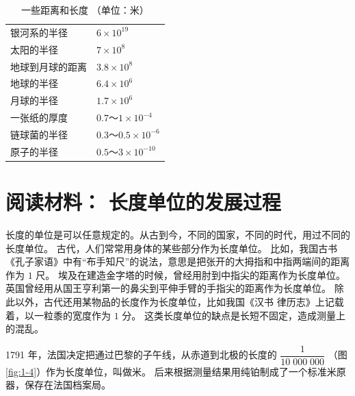 \begin{table}[H]
    \centering
    \caption*{一些距离和长度 （单位：米）}
    \begin{tabular}{w{l}{10em}w{r}{8em}}
        银河系的半径        & $6 \times 10^{19}$ \\
        太阳的半径          & $7 \times 10^8$ \\
        地球到月球的距离    & $3.8 \times 10^8$ \\
        地球的半径          & $6.4 \times 10^6$ \\
        月球的半径          & $1.7 \times 10^6$ \\
        一张纸的厚度        & $0.7 \text{～} 1 \times 10^{-4}$\footnotemark \\
        链球菌的半径        & $0.3 \text{～} 0.5 \times 10^{-6}$ \\
        原子的半径          & $0.5 \text{～} 3 \times 10^{-10}$ \\
    \end{tabular}
\end{table}


\section*{\textbf{阅读材料： 长度单位的发展过程}}

长度的单位是可以任意规定的。从古到今，不同的国家，不同的时代，用过不同的长度单位。
古代，人们常常用身体的某些部分作为长度单位。
比如，我国古书《孔子家语》中有“布手知尺”的说法，意思是把张开的大拇指和中指两端间的距离作为 $1$ 尺。
埃及在建造金字塔的时候，曾经用肘到中指尖的距离作为长度单位。
英国曾经用从国王亨利第一的鼻尖到平伸手臂的手指尖的距离作为长度单位。
除此以外，古代还用某物品的长度作为长度单位，比如我国《汉书 \; 律历志》上记载着，以一粒黍的宽度作为 $1$ 分。
这类长度单位的缺点是长短不固定，造成测量上的混乱。

1791 年，法国决定把通过巴黎的子午线，从赤道到北极的长度的 $\dfrac{1}{10 \; 000 \; 000}$ （图 \ref{fig:1-4}）作为长度单位，叫做米。
后来根据测量结果用纯铂制成了一个标准米原器，保存在法国档案局。


